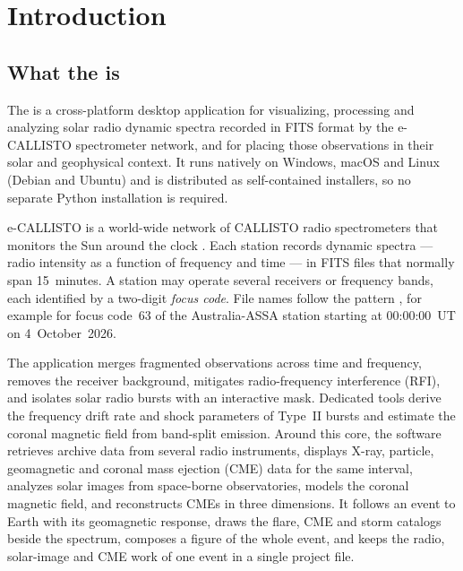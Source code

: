 \chapter{Introduction}
\label{ch:introduction}

\section{What the \appname{} is}

The \appname{} is a cross-platform desktop application for
visualizing, processing and analyzing solar radio dynamic spectra recorded in FITS format
by the e-CALLISTO spectrometer network, and for placing those observations in their solar
and geophysical context. It runs natively on Windows, macOS and Linux (Debian and Ubuntu)
and is distributed as self-contained installers, so no separate Python installation is
required.

e-CALLISTO is a world-wide network of CALLISTO radio
spectrometers that monitors the Sun around the clock \parencite{benz2009}. Each station
records dynamic spectra --- radio intensity as a function of frequency and time --- in
FITS files that normally span 15~minutes. A station may operate several receivers or
frequency bands, each identified by a two-digit \emph{focus code}. File
names follow the pattern
, for example
 for focus code~63 of the Australia-ASSA
station starting at 00:00:00~UT on 4~October~2026.

The application merges fragmented observations across time and frequency, removes the
receiver background, mitigates radio-frequency interference (RFI), and isolates
solar radio bursts with an interactive mask. Dedicated tools derive the frequency drift
rate and shock parameters of Type~II bursts and estimate the coronal magnetic field from
band-split emission. Around this core, the software retrieves archive data from several
radio instruments, displays X-ray, particle, geomagnetic and coronal mass ejection (CME)
data for the same interval, analyzes solar images from space-borne observatories, models
the coronal magnetic field, and reconstructs CMEs in three dimensions. It follows an event to
Earth with its geomagnetic response, draws the flare, CME and storm catalogs beside the
spectrum, composes a figure of the whole event, and keeps the radio, solar-image and CME work
of one event in a single project file.

